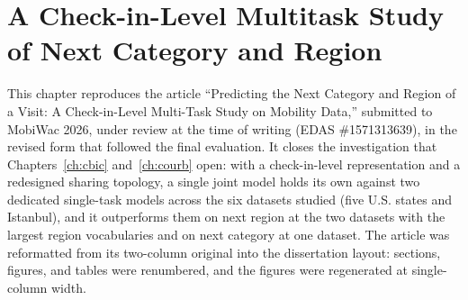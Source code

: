 \chapter[A Check-in-Level Multitask Study of Next Category and Region]{A Check-in-Level Multitask Study of Next Category and Region}
\label{ch:mobiwac}

\begin{chapterpreface}
This chapter reproduces the article ``Predicting the Next Category and Region of a
Visit: A Check-in-Level Multi-Task Study on Mobility Data,'' submitted to MobiWac
2026, under review at the time of writing (EDAS \#1571313639), in the revised form
that followed the final evaluation. It closes the
investigation that Chapters~\ref{ch:cbic} and~\ref{ch:courb} open: with a
check-in-level representation and a redesigned sharing topology, a single joint
model holds its own against two dedicated single-task
models across the six datasets studied (five U.S. states and Istanbul), and it
outperforms them on next region at the two datasets with the largest region
vocabularies and on next category at one dataset. The article was
reformatted from its two-column original into the dissertation layout: sections,
figures, and tables were renumbered, and the figures were regenerated at
single-column width.
\end{chapterpreface}

